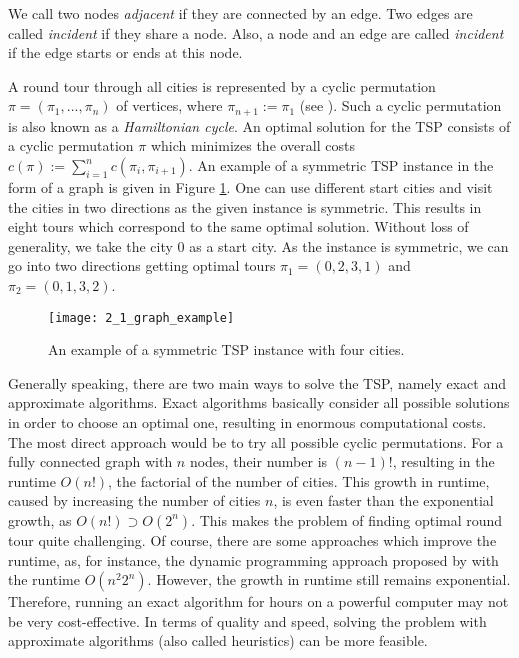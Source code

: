 We call two nodes \textit{adjacent} if they are connected by an edge. Two edges are called \textit{incident} if they share a node. Also, a node and an edge are called \textit{incident} if the edge starts or ends at this node. \par 

A round tour through all cities is represented by a cyclic permutation $\pi = (\pi_{1}, ..., \pi_{n})$ of vertices, where $\pi_{n+1} := \pi_{1}$ (see \cite{knust2020script}). Such a cyclic permutation is also known as a \textit{Hamiltonian cycle}. An optimal solution for the TSP consists of a cyclic permutation $\pi$ which minimizes the overall costs $c(\pi) := \sum_{i=1}^{n} c(\pi_{i}, \pi_{i + 1})$. An example of a symmetric TSP instance in the form of a graph is given in Figure \ref{2_1_graph_example}. One can use different start cities and visit the cities in two directions as the given instance is symmetric. This results in eight tours which correspond to the same optimal solution. \mbox{Without} loss of generality, we take the city 0 as a start city. As the instance is symmetric, we can go into two directions getting optimal tours $\pi_{1} = (0,2,3,1)$ and $\pi_{2} = (0,1,3,2)$. \\


\begin{figure}[htp] \centering
	\centering
	\texttt{[image: 2\_1\_graph\_example]}
	\caption{An example of a symmetric TSP instance with four cities.}
	\label{2_1_graph_example}
\end{figure}

 Generally speaking, there are two main ways to solve the TSP, namely exact and approximate algorithms. Exact algorithms basically consider all possible solutions in order to choose an optimal one, resulting in enormous computational costs. The most direct approach would be to try all possible cyclic permutations. For a fully connected graph with $n$ nodes, their number is $(n - 1)!$, resulting in the runtime ${O}(n!)$, the factorial of the number of cities. This growth in runtime, caused by increasing the number of cities $n$, is even faster than the exponential growth, as ${O}(n!)\supset {O}(2^{n})$. This makes the problem of finding optimal round tour quite challenging. Of course, there are some approaches which improve the runtime, as, for instance, the dynamic programming approach proposed by \citeauthor{bellman1962dynamic} \cite{bellman1962dynamic} with the runtime ${O}(n^{2}2^{n})$. However, the growth in runtime still remains exponential. Therefore, running an exact algorithm for hours on a powerful computer may not be very cost-effective. In terms of quality and speed, solving the problem with approximate algorithms (also called heuristics) can be more feasible. \par 
 
